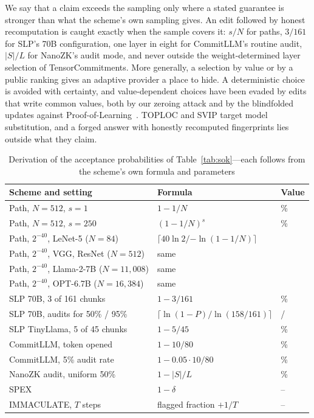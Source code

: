 We say that a claim exceeds the sampling only where a stated guarantee
is stronger than what the scheme's own sampling gives. An edit followed by honest recomputation is
caught exactly when the sample covers it: $s/N$ for paths, $3/161$ for SLP's 70B configuration,
one layer in eight for CommitLLM's routine audit, $|S|/L$ for NanoZK's audit mode, and never outside
the weight-determined layer selection of TensorCommitments. More generally, a selection by value or
by a public ranking gives an adaptive provider a place to hide. A deterministic choice is avoided
with certainty, and value-dependent choices have been evaded by edits that write common values,
both by our zeroing attack and by the blindfolded updates against
Proof-of-Learning~\cite{fang2023pol}. TOPLOC and SVIP target model substitution, and a forged
answer with honestly recomputed fingerprints lies outside what they claim.

\begin{table}[t]
  \caption{Derivation of the acceptance probabilities of Table~\ref{tab:sok}---each follows from the scheme's own formula and parameters}
  \label{tab:sok-derivation}
  \footnotesize
  \centering
  \setlength{\tabcolsep}{3pt}
  \begin{tabular}{@{}lll@{}}
    \toprule
    Scheme and setting & Formula & Value \\
    \midrule
    Path, $N{=}512$, $s{=}1$ & $1-1/N$ & \SokPathOne{}\% \\
    Path, $N{=}512$, $s{=}250$ & $(1-1/N)^{s}$ & \SokPathMany{}\% \\
    Path, $2^{-40}$, LeNet-5 ($N{=}84$) & $\lceil 40\ln2/{-\ln(1-1/N)}\rceil$ & \SokPathsLenet{} \\
    Path, $2^{-40}$, VGG, ResNet ($N{=}512$) & same & \SokPathsWide{} \\
    Path, $2^{-40}$, Llama-2-7B ($N{=}11{,}008$) & same & \SokPathsLlama{} \\
    Path, $2^{-40}$, OPT-6.7B ($N{=}16{,}384$) & same & \SokPathsOptL{} \\
    SLP 70B, 3 of 161 chunks & $1-3/161$ & \SokSlpAudit{}\% \\
    SLP 70B, audits for 50\% / 95\% & $\lceil\ln(1-P)/\ln(158/161)\rceil$ & \SokSlpAuditsHalf{} / \SokSlpAuditsMost{} \\
    SLP TinyLlama, 5 of 45 chunks & $1-5/45$ & \SokSlpTiny{}\% \\
    CommitLLM, token opened & $1-10/80$ & \SokCommitOpened{}\% \\
    CommitLLM, 5\% audit rate & $1-0.05\cdot10/80$ & \SokCommitRate{}\% \\
    NanoZK audit, uniform 50\% & $1-|S|/L$ & \SokNanoAudit{}\% \\
    SPEX & $1-\delta$ & -- \\
    IMMACULATE, $T$ steps & flagged fraction $+1/T$ & -- \\
    \bottomrule
  \end{tabular}
\end{table}

